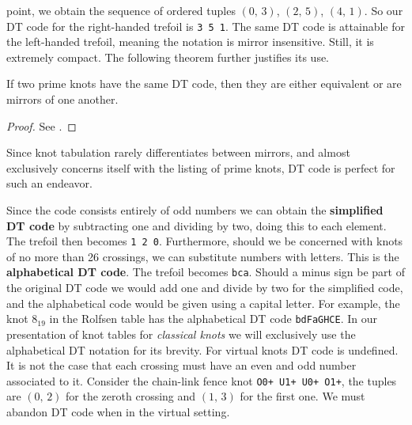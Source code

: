        point, we obtain the sequence of ordered tuples
        $(0,\,3)$, $(2,\,5)$, $(4,\,1)$. So our DT code for the right-handed
        trefoil is \texttt{3 5 1}. The same DT code is attainable for the
        left-handed trefoil, meaning the notation is mirror insensitive. Still,
        it is extremely compact. The following theorem further justifies its
        use.
        \begin{theorem}
            If two prime knots have the same DT code, then they are either
            equivalent or are mirrors of one another.
        \end{theorem}
        \begin{proof}
            See \cite{DOWKER198319}.
        \end{proof}
        Since knot tabulation rarely differentiates between mirrors, and
        almost exclusively concerns itself with the listing of prime knots,
        DT code is perfect for such an endeavor.
        \par\hfill\par
        Since the code consists entirely of odd numbers we can obtain the
        \textbf{simplified DT code} by subtracting one and dividing by two,
        doing this to each element. The trefoil then becomes
        \texttt{1 2 0}. Furthermore, should we be concerned with knots of
        no more than 26 crossings, we can substitute numbers with letters.
        This is the \textbf{alphabetical DT code}. The trefoil becomes
        \texttt{bca}. Should a minus sign be part of the original DT code
        we would add one and divide by two for the simplified code, and the
        alphabetical code would be given using a capital letter. For example,
        the knot $8_{19}$ in the Rolfsen table
        has the alphabetical DT code \texttt{bdFaGHCE}. In our presentation of
        knot tables for \textit{classical knots} we will exclusively use the
        alphabetical DT notation for its brevity. For virtual knots DT code is
        undefined. It is not the case that each crossing must have an even and
        odd number associated to it. Consider the chain-link fence knot
        \texttt{O0+ U1+ U0+ O1+}, the tuples are $(0,\,2)$ for the zeroth
        crossing and $(1,\,3)$ for the first one. We must abandon DT code when
        in the virtual setting.
        \par\hfill\par
